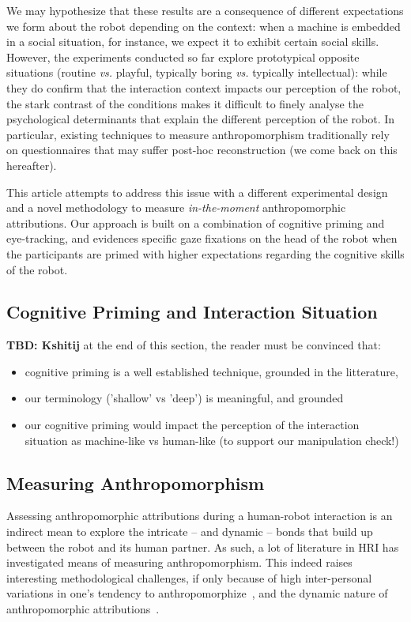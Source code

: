 \documentclass[lettersize, noapacite, twoside, HRI]{apa_HRI}
\newcommand{\vs}{\textit{vs.}\xspace}
\begin{document}
We may hypothesize that these results are a consequence of different
expectations we form about the robot depending on the context: when a machine is
embedded in a social situation, for instance, we expect it to exhibit certain
social skills. However, the experiments conducted so far explore prototypical
opposite situations (routine \vs playful, typically boring \vs typically
intellectual): while they do confirm that the interaction context impacts our
perception of the robot, the stark contrast of the conditions makes it difficult
to finely analyse the psychological determinants that explain the different
perception of the robot. In particular, existing
techniques to measure anthropomorphism traditionally rely on questionnaires that
may suffer post-hoc reconstruction (we come back on this hereafter).

This article attempts to address this issue with a different experimental design
and a novel methodology to measure \emph{in-the-moment} anthropomorphic attributions.
Our approach is built on a combination of cognitive priming and eye-tracking,
and evidences specific gaze fixations on the head of the robot when the
participants are primed with higher expectations regarding the cognitive skills
of the robot.


\subsection{Cognitive Priming and Interaction Situation}

\textbf{TBD: Kshitij} at the end of this section, the reader must be convinced
that:
\begin{itemize}
    \item cognitive priming is a well established technique, grounded in the
        litterature,
    \item our terminology ('shallow' vs 'deep') is meaningful, and grounded
    \item our cognitive priming would impact the perception of the interaction
        situation as machine-like vs human-like (to support our manipulation
        check!)
\end{itemize}

\subsection{Measuring Anthropomorphism}

Assessing anthropomorphic attributions during a human-robot interaction is an
indirect mean to explore the intricate -- and dynamic -- bonds that build up
between the robot and its human partner. As such, a lot of literature in HRI has
investigated means of measuring anthropomorphism. This indeed raises interesting
methodological challenges, if only because of high inter-personal variations in
one's tendency to anthropomorphize~, and the dynamic nature of
anthropomorphic attributions~\citep{lemaignan2014dynamics}.
\end{document}

